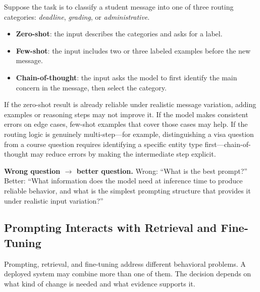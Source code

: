 \begin{example}
Suppose the task is to classify a student message into one of three routing categories: \emph{deadline}, \emph{grading}, or \emph{administrative}.
\begin{itemize}[leftmargin=*]
\item \textbf{Zero-shot}: the input describes the categories and asks for a label.
\item \textbf{Few-shot}: the input includes two or three labeled examples before the new message.
\item \textbf{Chain-of-thought}: the input asks the model to first identify the main concern in the message, then select the category.
\end{itemize}
If the zero-shot result is already reliable under realistic message variation, adding examples or reasoning steps may not improve it. If the model makes consistent errors on edge cases, few-shot examples that cover those cases may help. If the routing logic is genuinely multi-step---for example, distinguishing a visa question from a course question requires identifying a specific entity type first---chain-of-thought may reduce errors by making the intermediate step explicit.
\end{example}

\begin{thinkingtool}
\textbf{Wrong question $\rightarrow$ better question.} Wrong: ``What is the best prompt?'' Better: ``What information does the model need at inference time to produce reliable behavior, and what is the simplest prompting structure that provides it under realistic input variation?''
\end{thinkingtool}

\subsection{Prompting Interacts with Retrieval and Fine-Tuning}

Prompting, retrieval, and fine-tuning address different behavioral problems. A deployed system may combine more than one of them. The decision depends on what kind of change is needed and what evidence supports it.


